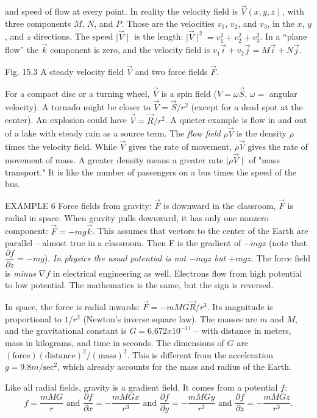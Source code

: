 and speed of flow at every point.
In reality the velocity field is $\vec V(x, y, z)$, with three components $M$, $N$, and $P$. Those are
the velocities $v_1$, $v_2$, and $v_3$, in the $x$, $y$, and $z$ directions. The speed $\mid \vec V \mid$ is the length: 
$\mid\vec V\mid^2 = v_1^2 + v_2^2 +v_3^2$. In a ``plane flow'' the $\vec k$ component is zero, and the velocity field is
$v_1\vec i+v_2\vec j= M\vec i+ N\vec j$.

Fig. 15.3 A steady velocity field $\vec V$ and two force fields $\vec F$. 

For a compact disc or a turning wheel, $\vec V$ is a spin field ($V =\omega \vec S$, $\omega=$ angular
velocity). A tornado might be closer to $\vec V =\vec S/r^2$ (except for a dead spot at the center).
An explosion could have $\vec V =\vec R/r^2$. A quieter example is flow in and out of a lake
with steady rain as a source term.
The \emph{flow field} $\rho \vec V$ is the density $\rho$ times the velocity field. While $\vec V$ gives the rate of
movement, $\rho \vec V$ gives the rate of movement of mass. A greater density means a greater
rate $\mid \rho \vec V \mid$ of "mass transport." It is like the number of passengers on a bus times the
speed of the bus.

EXAMPLE 6 Force fields from gravity: $\vec F$ is downward in the classroom, $\vec F$ is radial
in space.
When gravity pulls downward, it has only one nonzero component: $\vec F = -mg\vec k$. This
assumes that vectors to the center of the Earth are parallel -- almost true in a classroom.
Then F is the gradient of $-mgz$ (note that $\dfrac{\partial f}{\partial z} = -mg$).
\emph{In physics the usual potential is not $-mgz$ but $+mgz$.} The force field is \emph{minus} $\nabla f$
in electrical engineering as well. Electrons flow from high potential to low potential.
The mathematics is the same, but the sign is reversed.

In space, the force is radial inwards: $\vec F = -mMG\vec R/r^3$. Its magnitude is proportional
to $1/r^2$ (Newton's inverse square law). The masses are $m$ and $M$, and the
gravitational constant is $G =6.672 x 10^{-11}$ -- with distance in meters, mass in kilograms,
and time in seconds. The dimensions of $G$ are $(\text{force})(\text{distance})^2/(\text{mass})^2$. This
is different from the acceleration $g =9.8m/\text{sec}^2$, which already accounts for the mass
and radius of the Earth.

Like all radial fields, gravity is a gradient field. It comes from a potential $f$:
$$f=\dfrac{mMG}{r} \text{ and }\dfrac{\partial f}{\partial x}=-\dfrac{mMGx}{r^3} \text{ and }\dfrac{\partial f}{\partial y}=-\dfrac{mMGy}{r^3} \text{ and }\dfrac{\partial f}{\partial z}=-\dfrac{mMGz}{r^3}.$$ 

